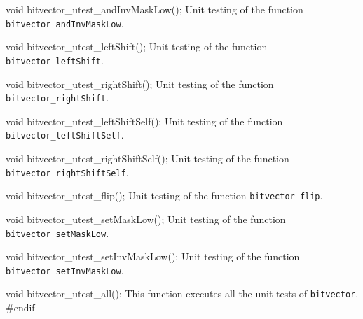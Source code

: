 void bitvector_utest_andInvMaskLow();
\endcode
 \tab  Unit testing of the function {\tt bitvector\_andInvMaskLow}.
 \endtab
\code

void bitvector_utest_leftShift();
\endcode
 \tab  Unit testing of the function {\tt bitvector\_leftShift}.
 \endtab
\code

void bitvector_utest_rightShift();
\endcode
 \tab  Unit testing of the function {\tt bitvector\_rightShift}.
 \endtab
\code

void bitvector_utest_leftShiftSelf();
\endcode
 \tab  Unit testing of the function {\tt bitvector\_leftShiftSelf}.
 \endtab
\code

void bitvector_utest_rightShiftSelf();
\endcode
 \tab  Unit testing of the function {\tt bitvector\_rightShiftSelf}.
 \endtab
\code

void bitvector_utest_flip();
\endcode
 \tab  Unit testing of the function {\tt bitvector\_flip}.
 \endtab
\code

void bitvector_utest_setMaskLow();
\endcode
 \tab  Unit testing of the function {\tt bitvector\_setMaskLow}.
 \endtab
\code

void bitvector_utest_setInvMaskLow();
\endcode
 \tab  Unit testing of the function {\tt bitvector\_setInvMaskLow}.
 \endtab
\code

void bitvector_utest_all();
\endcode
 \tab  This function executes all the unit tests of {\tt bitvector}.
 \endtab
\code
\hide
#endif
\endhide
\endcode
